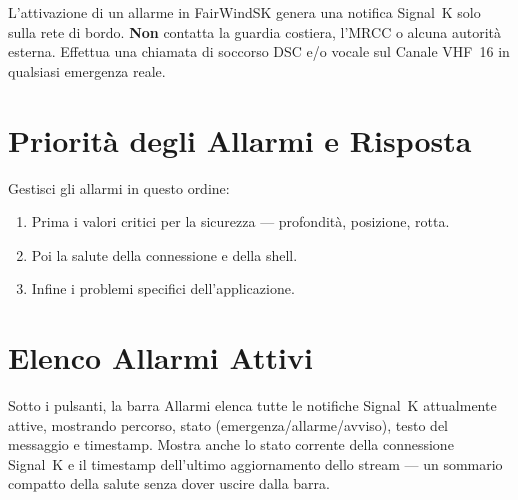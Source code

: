 \begin{warningbox}
L'attivazione di un allarme in FairWindSK genera una notifica Signal~K solo sulla
rete di bordo.
\textbf{Non} contatta la guardia costiera, l'MRCC o alcuna autorità esterna.
Effettua una chiamata di soccorso DSC e/o vocale sul Canale VHF~16 in qualsiasi
emergenza reale.
\end{warningbox}

\section{Priorità degli Allarmi e Risposta}

Gestisci gli allarmi in questo ordine:

\begin{enumerate}
  \item Prima i valori critici per la sicurezza --- profondità, posizione, rotta.
  \item Poi la salute della connessione e della shell.
  \item Infine i problemi specifici dell'applicazione.
\end{enumerate}

\section{Elenco Allarmi Attivi}

Sotto i pulsanti, la barra Allarmi elenca tutte le notifiche Signal~K attualmente attive,
mostrando percorso, stato (emergenza/allarme/avviso), testo del messaggio e timestamp.
Mostra anche lo stato corrente della connessione Signal~K e il timestamp dell'ultimo
aggiornamento dello stream --- un sommario compatto della salute senza dover uscire dalla barra.
